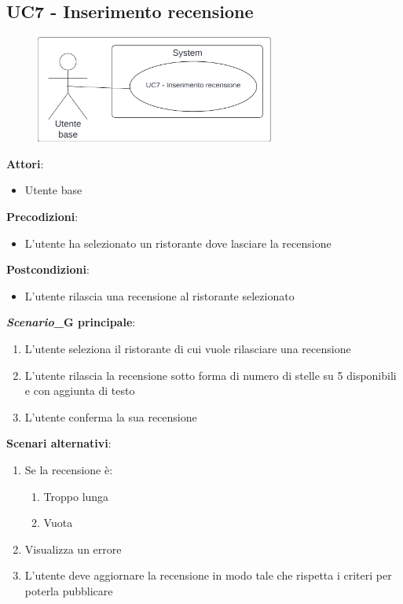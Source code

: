 \subsection{UC7 - Inserimento recensione}\label{usecase:7}
\begin{figure}[H]
  \centering
  \includegraphics[width=0.7\textwidth]{ucd/UCD7.png}
\end{figure}
\textbf{Attori}:
\begin{itemize}
    \item Utente base
\end{itemize}
\textbf{Precodizioni}:
\begin{itemize}
    \item L'utente ha selezionato un ristorante dove lasciare la recensione
\end{itemize}
\textbf{Postcondizioni}:
\begin{itemize}
    \item L'utente rilascia una recensione al ristorante selezionato
\end{itemize}
\textbf{\textit{Scenario}_G principale}:
\begin{enumerate}
    \item L'utente seleziona il ristorante di cui vuole rilasciare una recensione
    \item L'utente rilascia la recensione sotto forma di numero di stelle su 5 disponibili e con aggiunta di testo
    \item L'utente conferma la sua recensione
\end{enumerate}
\textbf{Scenari alternativi}:
\begin{enumerate}
    \item Se la recensione è:
    \begin{enumerate}
        \item Troppo lunga
        \item Vuota
    \end{enumerate}
    \item Visualizza un errore
    \item L'utente deve aggiornare la recensione in modo tale che rispetta i criteri per poterla pubblicare
\end{enumerate}
\newpage